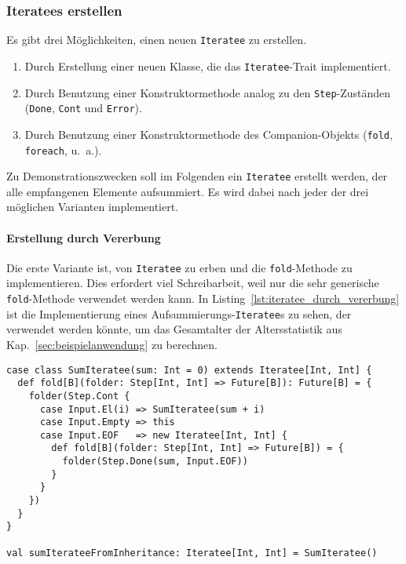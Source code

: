 \subsubsection{Iteratees erstellen} %
\label{ssub:iteratees_erstellen}

Es gibt drei Möglichkeiten, einen neuen \lstinline|Iteratee| zu erstellen.
\begin{enumerate}
  \item Durch Erstellung einer neuen Klasse, die das \lstinline|Iteratee|-Trait implementiert.
  \item Durch Benutzung einer Konstruktormethode analog zu den \lstinline|Step|-Zuständen (\lstinline|Done|, \lstinline|Cont| und \lstinline|Error|).
  \item Durch Benutzung einer Konstruktormethode des Companion-Objekts (\lstinline|fold|, \lstinline|foreach|, u.~a.).
\end{enumerate}

Zu Demonstrationszwecken soll im Folgenden ein \lstinline|Iteratee| erstellt werden, der alle empfangenen Elemente aufsummiert.
Es wird dabei nach jeder der drei möglichen Varianten implementiert.

\paragraph{Erstellung durch Vererbung} %
\label{par:erstellung_durch_vererbung}\mbox{} %

Die erste Variante ist, von \lstinline|Iteratee| zu erben und die \lstinline|fold|-Methode zu implementieren.
Dies erfordert viel Schreibarbeit, weil nur die sehr generische \lstinline|fold|-Methode verwendet werden kann.
In Listing~\ref{lst:iteratee_durch_vererbung} ist die Implementierung eines Aufsummierungs-\lstinline|Iteratee|s zu sehen, der verwendet werden könnte, um das Gesamtalter der Altersstatistik aus Kap.~\ref{sec:beispielanwendung} zu berechnen.

\begin{lstlisting}[caption=Erstellung eines Iteratees durch Vererbung, label=lst:iteratee_durch_vererbung]
case class SumIteratee(sum: Int = 0) extends Iteratee[Int, Int] {
  def fold[B](folder: Step[Int, Int] => Future[B]): Future[B] = {
    folder(Step.Cont {
      case Input.El(i) => SumIteratee(sum + i)
      case Input.Empty => this
      case Input.EOF   => new Iteratee[Int, Int] {
        def fold[B](folder: Step[Int, Int] => Future[B]) = {
          folder(Step.Done(sum, Input.EOF))
        }
      }
    })
  }
}

val sumIterateeFromInheritance: Iteratee[Int, Int] = SumIteratee()
\end{lstlisting}

